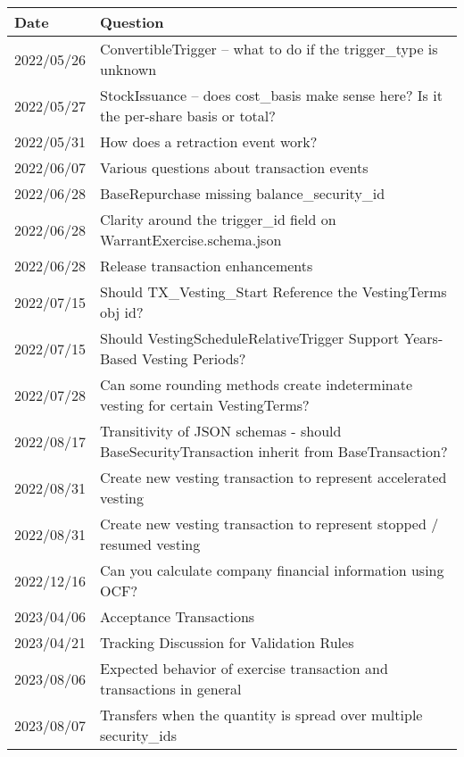 \begin{longtable}[htbp]
  \begin{tabularx}{\textwidth}{|l|X|}
    \toprule
    Date & Question \\
    \midrule
    2022/05/26 & ConvertibleTrigger -- what to do if the trigger\_type is unknown \\
    \midrule
    2022/05/27 & StockIssuance -- does cost\_basis make sense here? Is it the per-share basis or total? \\
    \midrule
    2022/05/31 & How does a retraction event work? \\
    \midrule
    2022/06/07 & Various questions about transaction events \\
    \midrule
    2022/06/28 & BaseRepurchase missing balance\_security\_id \\
    \midrule
    2022/06/28 & Clarity around the trigger\_id field on WarrantExercise.schema.json \\
    \midrule
    2022/06/28 & Release transaction enhancements \\
    \midrule
    2022/07/15 & Should TX\_Vesting\_Start Reference the VestingTerms obj id? \\
    \midrule
    2022/07/15 & Should VestingScheduleRelativeTrigger Support Years-Based Vesting Periods? \\
    \midrule
    2022/07/28 & Can some rounding methods create indeterminate vesting for certain VestingTerms? \\
    \midrule
    2022/08/17 & Transitivity of JSON schemas - should BaseSecurityTransaction inherit from BaseTransaction? \\
    \midrule
    2022/08/31 & Create new vesting transaction to represent accelerated vesting \\
    \midrule
    2022/08/31 & Create new vesting transaction to represent stopped / resumed vesting \\
    \midrule
    2022/12/16 & Can you calculate company financial information using OCF? \\
    \midrule
    2023/04/06 & Acceptance Transactions \\
    \midrule
    2023/04/21 & Tracking Discussion for Validation Rules \\
    \midrule
    2023/08/06 & Expected behavior of exercise transaction and transactions in general \\
    \midrule
    2023/08/07 & Transfers when the quantity is spread over multiple security\_ids \\
    \bottomrule
  \end{tabularx}
\end{longtable}